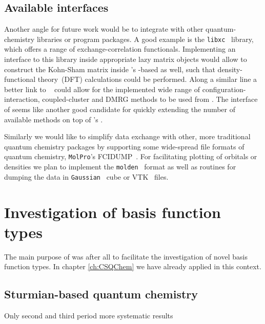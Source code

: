 \subsection{Available interfaces}
Another angle for future work would be to integrate with other
quantum-chemistry libraries or program packages.
A good example is the \texttt{libxc}~\cite{Lehtola2018} library,
which offers a range of exchange-correlation functionals.
Implementing an interface to this library inside appropriate
lazy matrix objects would allow to construct the Kohn-Sham matrix
inside \molsturm's \contraction-based \SCF as well,
such that density-functional theory~(DFT) calculations
could be performed.
Along a similar line a better link to \pyscf~\cite{Sun2017}
could allow for the implemented wide range of configuration-interaction,
coupled-cluster and DMRG methods to be used from \molsturm.
The \python interface of \psifour seems like another good candidate
for quickly extending the number of available methods
on top of \molsturm's \SCF.

Similarly we would like to simplify
data exchange with other, more traditional quantum chemistry packages
by supporting some wide-spread file formats of quantum chemistry,
\eg \texttt{MolPro}'s FCIDUMP~\cite{Knowles1989}.
For facilitating plotting of \SCF orbitals or densities
we plan to implement the \texttt{molden}~\cite{Schaftenaar2000} format
as well as routines for dumping the data
in \texttt{Gaussian}~\cite{Frisch2016} cube or VTK~\cite{Avila2010} files.


\section{Investigation of basis function types}

The main purpose of \molsturm was after all to facilitate
the investigation of novel basis function types.
In chapter \vref{ch:CSQChem} we have already applied
\molsturm in this context. 

\subsection{Sturmian-based quantum chemistry}

Only second and third period
more systematic results



